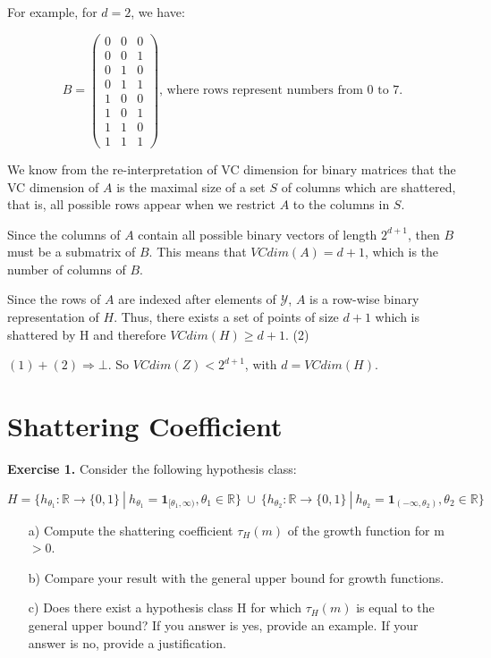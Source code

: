 \documentclass{article}
\newcommand{\<}{\langle}
\renewcommand{\>}{\rangle}
\theoremstyle{definition}
\begin{document}
For example, for $d = 2$, we have:

\[B = 
\begin{pmatrix}
0 & 0 & 0 \\
0 & 0 & 1 \\
0 & 1 & 0 \\
0 & 1 & 1 \\
1 & 0 & 0 \\
1 & 0 & 1 \\
1 & 1 & 0 \\
1 & 1 & 1 
\end{pmatrix} \text{, where rows represent numbers from 0 to 7.}
\]

We know from the re-interpretation of VC dimension for binary matrices that the VC dimension of $A$ is the maximal size of a set $S$ of columns which are shattered, that is, all possible rows appear when we restrict $A$ to the columns in $S$.

Since the columns of $A$ contain all possible binary vectors of length $2^{d+1}$, then $B$ must be a submatrix of $B$. This means that $VCdim(A) = d + 1$, which is the number of columns of $B$.

Since the rows of $A$ are indexed after elements of $\mathcal{Y}$, $A$ is a row-wise binary representation of $H$. Thus, there exists a set of points of size $d+1$ which is shattered by H and therefore $VCdim(H) \geq d+1$. \hspace{4.8cm} (2)

\vspace{1mm}

$(1) + (2) \Rightarrow \bot$. So $VCdim(Z) < 2^{d+1}$, with $d = VCdim(H)$.

\newpage

\section{Shattering Coefficient}

\textbf{Exercise 1.} Consider the following hypothesis class:

$$H = \{h_{\theta_{1}} : \mathbb{R} \rightarrow \{0,1\} \ | \ h_{\theta_{1}} = \textbf{1}_{[\theta_1, \infty)}, \theta_1 \in \mathbb{R}\} \ \cup \ \{h_{\theta_{2}} : \mathbb{R} \rightarrow \{0,1\} \ | \ h_{\theta_{2}} = \textbf{1}_{(-\infty, \theta_2)}, \theta_2 \in \mathbb{R}\}$$

\begin{itemize}
    \item[a)] Compute the shattering coefficient $\tau_H(m)$ of the growth function for m$>$0.
    \item[b)] Compare your result with the general upper bound for growth functions.
    \item[c)] Does there exist a hypothesis class H for which $\tau_H(m)$ is equal to the general upper bound? If you answer is yes, provide an example. If your answer is no, provide a justification.
\end{itemize}
\end{document}
